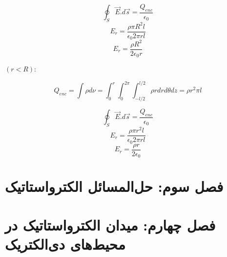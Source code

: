 \documentclass[11pt]{book}
\begin{document}
\[ \oint_S \vec{E}.d\vec{s} = \frac{Q_{enc}}{\epsilon_0} \]
\[ E_r = \frac{\rho \pi R^2 l}{\epsilon_0 2\pi rl} \]
\[ E_r = \frac{\rho R^2}{2\epsilon_0 r} \]

$(r<R)$:

\[ Q_{enc} = \int \rho d\nu = \int_{0}^{r} \int_{0}^{2\pi} \int_{-l/2}^{l/2} \rho r dr d\theta dz = \rho r^2 \pi l\]

\[ \oint_S \vec{E}.d\vec{s} = \frac{Q_{enc}}{\epsilon_0} \]
\[ E_r = \frac{\rho \pi r^2 l}{\epsilon_0 2\pi rl} \]
\[ E_r = \frac{\rho r}{2\epsilon_0} \]

\subsection{}

\newpage
\section{فصل سوم: حل‌المسائل الکترواستاتیک}

\section{فصل چهارم: میدان الکترواستاتیک در محیط‌های دی‌الکتریک}
\end{document}
